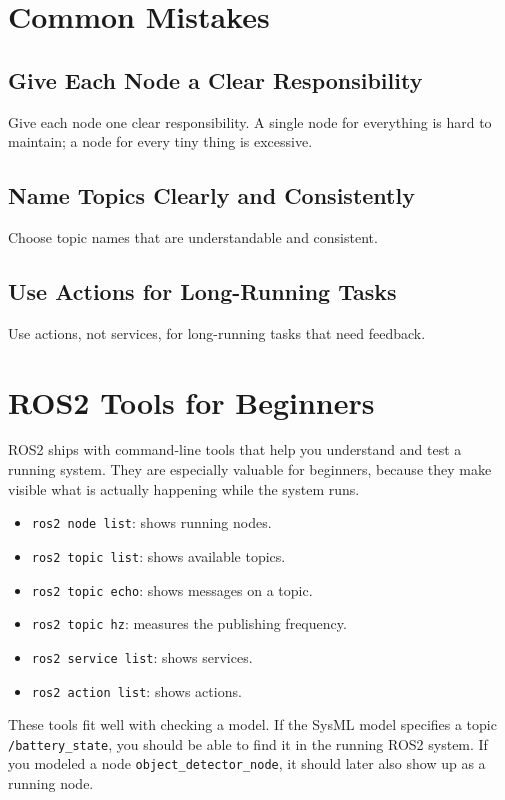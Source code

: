 \section{Common Mistakes}
\subsection{Give Each Node a Clear Responsibility}
Give each node one clear responsibility. A single node for everything is hard to maintain; a node for every tiny thing is excessive.

\subsection{Name Topics Clearly and Consistently}
Choose topic names that are understandable and consistent.

\subsection{Use Actions for Long-Running Tasks}
Use actions, not services, for long-running tasks that need feedback.

\section{ROS2 Tools for Beginners}
ROS2 ships with command-line tools that help you understand and test a running system. They are especially valuable for beginners, because they make visible what is actually happening while the system runs.

\begin{itemize}
    \item \texttt{ros2 node list}: shows running nodes.
    \item \texttt{ros2 topic list}: shows available topics.
    \item \texttt{ros2 topic echo}: shows messages on a topic.
    \item \texttt{ros2 topic hz}: measures the publishing frequency.
    \item \texttt{ros2 service list}: shows services.
    \item \texttt{ros2 action list}: shows actions.
\end{itemize}

These tools fit well with checking a model. If the SysML model specifies a topic \texttt{/battery\_state}, you should be able to find it in the running ROS2 system. If you modeled a node \texttt{object\_detector\_node}, it should later also show up as a running node.

